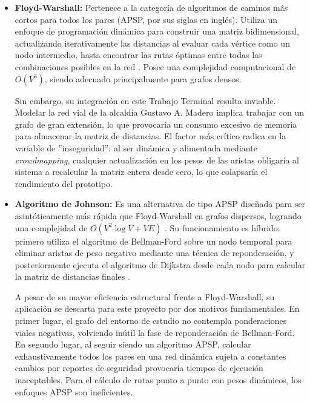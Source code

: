 \begin{itemize}

    \item \textbf{Floyd-Warshall:} Pertenece a la categoría de algoritmos de caminos más cortos para todos los pares (APSP, por sus siglas en inglés). Utiliza un enfoque de programación dinámica para construir una matriz bidimensional, actualizando iterativamente las distancias al evaluar cada vértice como un nodo intermedio, hasta encontrar las rutas óptimas entre todas las combinaciones posibles en la red \cite{gfg_floyd_warshall, gfg_floyd_warshall_cpp, gfg_floyd_warshall_c}. Posee una complejidad computacional de $O(V^3)$, siendo adecuado principalmente para grafos densos.
    
    Sin embargo, su integración en este Trabajo Terminal resulta inviable. Modelar la red vial de la alcaldía Gustavo A. Madero implica trabajar con un grafo de gran extensión, lo que provocaría un consumo excesivo de memoria para almacenar la matriz de distancias. El factor más crítico radica en la variable de ''inseguridad'': al ser dinámica y alimentada mediante \textit{crowdmapping}, cualquier actualización en los pesos de las aristas obligaría al sistema a recalcular la matriz entera desde cero, lo que colapsaría el rendimiento del prototipo.

    \item \textbf{Algoritmo de Johnson:} Es una alternativa de tipo APSP diseñada para ser asintóticamente más rápida que Floyd-Warshall en grafos dispersos, logrando una complejidad de $O(V^2 \log V + VE)$ \cite{enjoyalgorithms_graphs}. Su funcionamiento es híbrido: primero utiliza el algoritmo de Bellman-Ford sobre un nodo temporal para eliminar aristas de peso negativo mediante una técnica de reponderación, y posteriormente ejecuta el algoritmo de Dijkstra desde cada nodo para calcular la matriz de distancias finales \cite{book_algoritmos_johnson}.
    
    A pesar de su mayor eficiencia estructural frente a Floyd-Warshall, su aplicación se descarta para este proyecto por dos motivos fundamentales. En primer lugar, el grafo del entorno de estudio no contempla ponderaciones viales negativas, volviendo inútil la fase de reponderación de Bellman-Ford. En segundo lugar, al seguir siendo un algoritmo APSP, calcular exhaustivamente todos los pares en una red dinámica sujeta a constantes cambios por reportes de seguridad provocaría tiempos de ejecución inaceptables. Para el cálculo de rutas punto a punto con pesos dinámicos, los enfoques APSP son ineficientes.


\end{itemize}
